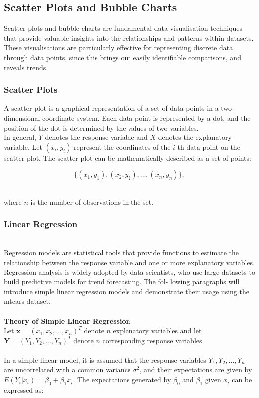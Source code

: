 \documentclass{article}\usepackage[]{graphicx}\usepackage[]{xcolor}
\begin{document}
\subsection{Scatter Plots and Bubble Charts}

Scatter plots and bubble charts are fundamental data visualisation techniques that provide valuable insights into the relationships and patterns within datasets. These visualisations are particularly effective for representing discrete data through data points, since this brings out easily identifiable comparisons, and reveals trends.

\subsubsection{Scatter Plots}

A scatter plot is a graphical representation of a set of data points in a two-dimensional coordinate system. Each data point is represented by a dot, and the position of the dot is determined by the values of two variables.\\

\noindent
In general, \(Y\) denotes the response variable and \(X\) denotes the explanatory variable. Let \((x_i, y_i)\) represent the coordinates of the \(i\)-th data point on the scatter plot. The scatter plot can be mathematically described as a set of points:

\[ \{(x_1, y_1), (x_2, y_2), \ldots, (x_n, y_n)\}, \]
  
\\
\noindent where \(n\) is the number of observations in the set.\\


\subsubsection{Linear Regression}
\\Regression models are statistical tools that provide functions to estimate the relationship between the response variable and one or more explanatory variables. Regression analysis is widely adopted by data scientists, who use large datasets to build predictive models for trend forecasting. The fol- lowing paragraphs will introduce simple linear regression models and demonstrate their usage using the mtcars dataset.
\\  
\\   
\noindent
\textbf{Theory of Simple Linear Regression}
\\Let $\mathbf{x} = (x_1, x_2, ..., x_n)^T$ denote $n$ explanatory variables and let $\mathbf{Y} = (Y_1,Y_2,...,Y_n)^T$ denote $n$ corresponding response variables.
\\  
\\In a simple linear model, it is assumed that the response variables $Y_1,Y_2,...,Y_n$ are uncorrelated with a common variance $\sigma^2$, and their expectations are given by $E(Y_i| x_i) = \beta_0 + \beta_1 x_i$. The expectations generated by $\beta_0$ and $\beta_1$ given $x_i$ can be expressed as:
\end{document}
